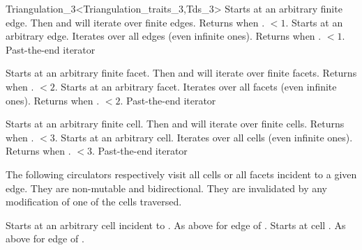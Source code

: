 \begin{ccRefClass}{Triangulation_3<Triangulation_traits_3,Tds_3>}
{Starts at an arbitrary finite edge. Then \ccc{++} and \ccc{--} will
iterate over finite edges. Returns  when
\ccVar. $<1$.} 
\ccGlue
{}
{Starts at an arbitrary edge. Iterates over all edges (even infinite
ones). Returns  when \ccVar. $<1$.}
\ccGlue
{}
{Past-the-end iterator}

{Starts at an arbitrary finite facet. Then \ccc{++} and \ccc{--} will
iterate over finite facets. Returns  when
\ccVar. $<2$.}
\ccGlue
{}
{Starts at an arbitrary facet. Iterates over all facets (even infinite
ones). Returns  when 
\ccVar. $<2$.}
\ccGlue
{}
{Past-the-end iterator}

{Starts at an arbitrary finite cell. Then \ccc{++} and \ccc{--} will
iterate over finite cells. Returns  when
\ccVar. $<3$.}
\ccGlue
{}
{Starts at an arbitrary cell. Iterates over all cells (even infinite
ones). Returns  when 
\ccVar. $<3$.}
\ccGlue
{}
{Past-the-end iterator}


The following circulators respectively visit all cells or all facets
incident to a given edge. They are non-mutable and bidirectional. They
are invalidated by any modification of one of the cells traversed. 

{Starts at an arbitrary cell incident to .
}
\ccGlue
{}
{As above for edge  of .}
\ccGlue
{}
{Starts at cell .
}
\ccGlue
{}
{As above for edge  of .}


\end{ccRefClass}
